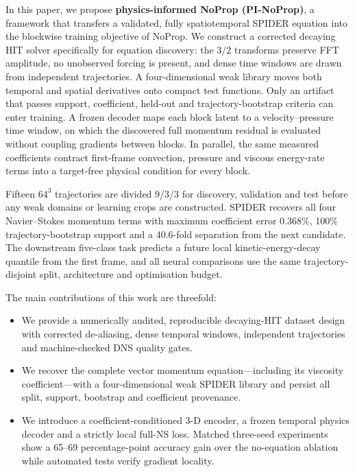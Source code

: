 \documentclass[preprint,12pt]{elsarticle}
\begin{document}
In this paper, we propose \textbf{physics-informed NoProp (PI-NoProp)}, a
framework that transfers a validated, fully spatiotemporal SPIDER equation into
the blockwise training objective of NoProp.  We construct a corrected decaying
HIT solver specifically for equation discovery: the $3/2$ transforms preserve
FFT amplitude, no unobserved forcing is present, and dense time windows are
drawn from independent trajectories.  A four-dimensional weak library moves
both temporal and spatial derivatives onto compact test functions.  Only an
artifact that passes support, coefficient, held-out and trajectory-bootstrap
criteria can enter training. A frozen decoder maps each block latent to a
velocity--pressure time window, on which the discovered full momentum residual
is evaluated without coupling gradients between blocks.  In parallel, the
same measured coefficients contract first-frame convection, pressure and
viscous energy-rate terms into a target-free physical condition for every
block.

Fifteen $64^3$ trajectories are divided 9/3/3 for discovery, validation and
test before any weak domains or learning crops are constructed.  SPIDER
recovers all four Navier--Stokes momentum terms with maximum coefficient error
$0.368\%$, 100\% trajectory-bootstrap support and a 40.6-fold separation from
the next candidate.  The downstream five-class task predicts a future local
kinetic-energy-decay quantile from the first frame, and all neural comparisons
use the same trajectory-disjoint split, architecture and optimisation budget.

The main contributions of this work are threefold:
\begin{itemize}
    \item We provide a numerically audited, reproducible decaying-HIT dataset
    design with corrected de-aliasing, dense temporal windows, independent
    trajectories and machine-checked DNS quality gates.
    \item We recover the complete vector momentum equation---including its
    viscosity coefficient---with a four-dimensional weak SPIDER library and
    persist all split, support, bootstrap and coefficient provenance.
    \item We introduce a coefficient-conditioned 3-D encoder, a frozen temporal
    physics decoder and a strictly local full-NS loss. Matched three-seed
    experiments show a 65--69 percentage-point accuracy gain over the
    no-equation ablation while automated tests verify gradient locality.
\end{itemize}
\end{document}
